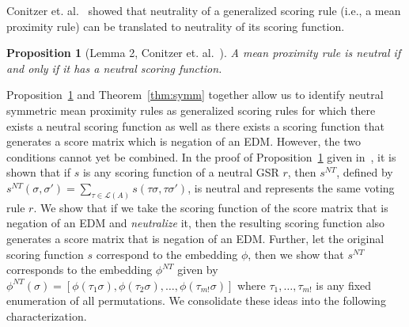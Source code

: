 \documentclass[10pt,letterpaper]{article}
\newcommand{\calL}{{\mathcal{L}}}
\newcommand{\rank}{{\calL(A)}}
\newtheorem{proposition}{Proposition}
\newcommand{\nt}{NT}
\begin{document}

Conitzer et. al.~\cite{CRX09} showed that neutrality of a generalized scoring rule (i.e., a mean proximity rule) can be translated to neutrality of its scoring function.
\begin{proposition}[Lemma 2, Conitzer et. al.~\cite{CRX09}]
A mean proximity rule is neutral if and only if it has a neutral scoring function.
\label{prop:gsr-neutral}
\end{proposition}


Proposition~\ref{prop:gsr-neutral} and Theorem~\ref{thm:symm} together allow us to identify neutral symmetric mean proximity rules as generalized scoring rules for which there exists a neutral scoring function as well as there exists a scoring function that generates a score matrix which is negation of an EDM. However, the two conditions cannot yet be combined. In the proof of Proposition~\ref{prop:gsr-neutral} given in~\cite{CRX09}, it is shown that if $s$ is any scoring function of a neutral GSR $r$, then $s^{\nt}$, defined by $s^{\nt}(\sigma,\sigma') = \sum_{\tau \in \rank} s(\tau \sigma, \tau \sigma')$, is neutral and represents the same voting rule $r$. We show that if we take the scoring function of the score matrix that is negation of an EDM and \emph{neutralize} it, then the resulting scoring function also generates a score matrix that is negation of an EDM. Further, let the original scoring function $s$ correspond to the embedding $\phi$, then we show that $s^{\nt}$ corresponds to the embedding $\phi^{\nt}$ given by $\phi^{\nt}(\sigma) = [\phi(\tau_1 \sigma), \phi(\tau_2 \sigma), \ldots, \phi(\tau_{m!} \sigma)]$ where $\tau_1,\ldots,\tau_{m!}$ is any fixed enumeration of all permutations. We consolidate these ideas into the following characterization.

\end{document}
